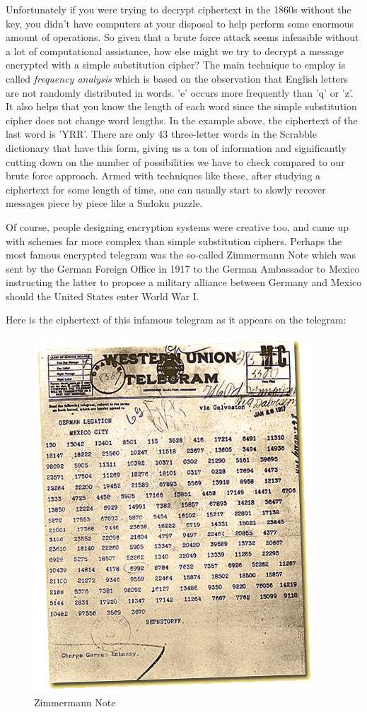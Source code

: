 \documentclass[UTF8]{book}
\begin{document}
\begin{CJK}{UTF8}{gbsn}
Unfortunately if you were trying to decrypt ciphertext in the 1860s without the key, you didn't have computers at your disposal to help perform some enormous amount of operations. So given that a brute force attack seems infeasible without a lot of computational assistance, how else might we try to decrypt a message encrypted with a simple substitution cipher? The main technique to employ is called \emph{frequency analysis} which is based on the observation that English letters are not randomly distributed in words. 'e' occurs more frequently than 'q' or 'z'. It also helps that you know the length of each word since the simple substitution cipher does not change word lengths. In the example above, the ciphertext of the last word is 'YRR'. There are only 43 three-letter words in the Scrabble dictionary that have this form, giving us a ton of information and significantly cutting down on the number of possibilities we have to check compared to our brute force approach. Armed with techniques like these, after studying a ciphertext for some length of time, one can usually start to slowly recover messages piece by piece like a Sudoku puzzle.

Of course, people designing encryption systems were creative too, and came up with schemes far more complex than simple substitution ciphers. Perhaps the most famous encrypted telegram was the so-called Zimmermann Note which was sent by the German Foreign Office in 1917 to the German Ambassador to Mexico instructing the latter to propose a military alliance between Germany and Mexico should the United States enter World War I.

Here is the ciphertext of this infamous telegram as it appears on the telegram:

\begin{figure}[H]
\centering
\includegraphics[width=0.8\linewidth]{zimmermann}
\caption{Zimmermann Note}
\end{figure}


\end{CJK}
\end{document}

